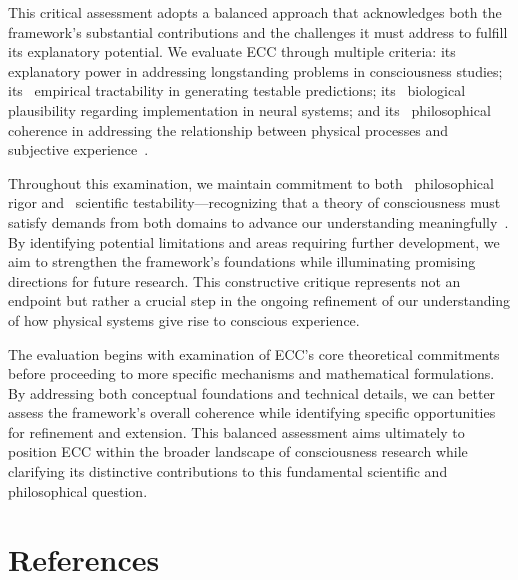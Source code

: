 \begin{refsection}
    This critical assessment adopts a balanced approach that acknowledges both the framework's substantial contributions and the challenges it must address to fulfill its explanatory potential. We evaluate ECC through multiple criteria: its~ explanatory power in addressing longstanding problems in consciousness studies; its~ empirical tractability in generating testable predictions; its~ biological plausibility regarding implementation in neural systems; and its~ philosophical coherence in addressing the relationship between physical processes and subjective experience~\cite{seth2021being, koch2019feeling, varela2016embodied}.

    Throughout this examination, we maintain commitment to both~ philosophical rigor and~ scientific testability—recognizing that a theory of consciousness must satisfy demands from both domains to advance our understanding meaningfully~\cite{dennett2017bacteria, goff2019galileo}. By identifying potential limitations and areas requiring further development, we aim to strengthen the framework's foundations while illuminating promising directions for future research. This constructive critique represents not an endpoint but rather a crucial step in the ongoing refinement of our understanding of how physical systems give rise to conscious experience.

    The evaluation begins with examination of ECC's core theoretical commitments before proceeding to more specific mechanisms and mathematical formulations. By addressing both conceptual foundations and technical details, we can better assess the framework's overall coherence while identifying specific opportunities for refinement and extension. This balanced assessment aims ultimately to position ECC within the broader landscape of consciousness research while clarifying its distinctive contributions to this fundamental scientific and philosophical question.

    

    

    

    \newpage
    \section{References}
    \printbibliography[title={},heading=subbibliography]
\end{refsection}